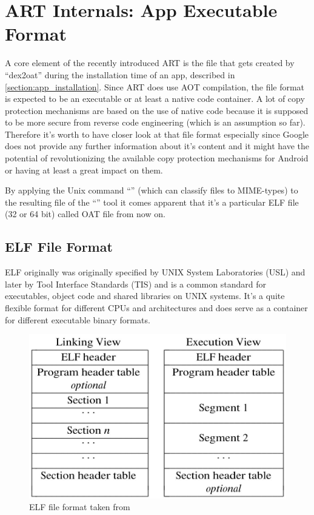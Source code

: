 \chapter{ART Internals: App Executable Format}
\label{chapter:art_internals_app_executable_format}

A core element of the recently introduced ART is the file that
gets created by ``dex2oat'' during the installation time of an app,
described in \autoref{section:app_installation}.
Since ART does use AOT compilation, the file format is expected
to be an executable or at least a native code container.
A lot of copy protection mechanisms are based on the use of native
code because it is supposed to be more secure from reverse code
engineering (which is an assumption so far).
Therefore it's worth to have closer look at that file format
especially since Google does not provide any further information
about it's content and it might have the potential of
revolutionizing the available copy protection mechanisms for
Android or having at least a great impact on them.

By applying the Unix command ``'' (which can classify
files to MIME-types) to the resulting file of the ``''
tool it comes apparent that it's a particular ELF file (32 or 64 bit)
called OAT file from now on.

\section{ELF File Format}\label{section:elf_file_format}
ELF originally was originally specified by UNIX System Laboratories
(USL) and later by Tool Interface Standards (TIS) and is a common
standard for executables, object code and shared libraries on UNIX
systems. It's a quite flexible format for different CPUs and
architectures and does serve as a container for different
executable binary formats.

\begin{figure}[htb]
  \centering
  \includegraphics[scale=0.4]{figures/elf_format}
  \caption[ELF file format]{ELF file format taken from \parencite{portable_formats_spec}}
  \label{fig:elf_format}
\end{figure}

